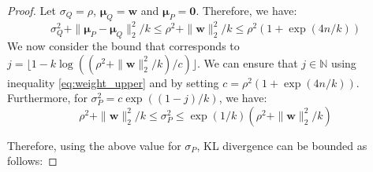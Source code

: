 \documentclass{article} %
\begin{document}
\begin{proof}
Let $\sigma_Q=\rho$, $\boldsymbol{\mu}_Q=\boldsymbol{w}$ and $\boldsymbol{\mu}_P=\boldsymbol{0}$. Therefore, we have:
\begin{equation}\label{eq:weight_upper}
    \sigma_Q^2+\|\boldsymbol{\mu}_P-\boldsymbol{\mu}_Q\|_2^2/k \leq \rho^2 + \|\boldsymbol{w}\|_2^2/k \leq \rho^2(1+\exp(4n/k))
\end{equation}
We now consider the bound that corresponds to $j=\lfloor 1 - k\log((\rho^2 + \|\boldsymbol{w}\|_2^2/k)/c)\rfloor$. We can ensure that $j\in \mathbb{N}$ using inequality \eqref{eq:weight_upper} and by setting $c=\rho^2(1+\exp(4n/k))$. Furthermore, for $\sigma_P^2=c\exp((1-j)/k)$, we have:
\begin{equation}
    \rho^2 + \|\boldsymbol{w}\|_2^2/k \leq \sigma_P^2 \leq \exp(1/k) \left(\rho^2 + \|\boldsymbol{w}\|_2^2/k\right)
\end{equation}


Therefore, using the above value for $\sigma_P$, KL divergence can be bounded as follows:


\end{proof}
\end{document}
